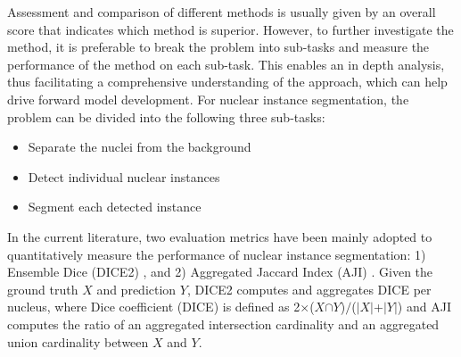 \documentclass[journal]{IEEEtran}
\begin{document}
    Assessment and comparison of different methods is usually given by an overall score that indicates which method is superior. However, to further investigate the method, it is preferable to break the problem into sub-tasks and measure the performance of the method on each sub-task. This enables an in depth analysis, thus facilitating a comprehensive understanding of the approach, which can help drive forward model development. For nuclear instance segmentation, the problem can be divided into the following three sub-tasks:
	\begin{itemize}
		\item Separate the nuclei from the background
		\item Detect individual nuclear instances
		\item Segment each detected instance
	\end{itemize}
	In the current literature, two evaluation metrics have been mainly adopted to quantitatively measure the performance of nuclear instance segmentation: 1) Ensemble Dice (DICE2) \cite{vu2018methods}, and 2) Aggregated Jaccard Index (AJI) \cite{kumar}. Given the ground truth $X$ and prediction $Y$, DICE2 computes and aggregates DICE per nucleus, where Dice coefficient (DICE) is defined as 2$\times$($X$$\cap$$Y$)$\slash$($\mid$$X$$\mid$+$\mid$$Y$$\mid$) and AJI computes the ratio of an aggregated intersection cardinality and an aggregated union cardinality between $X$ and $Y$. 
	
\end{document}
